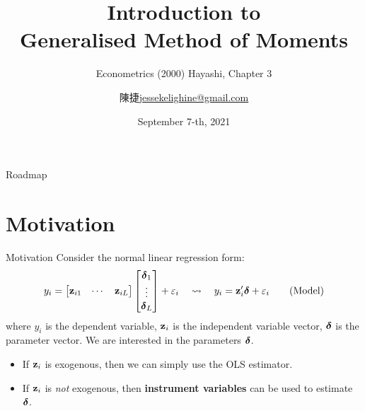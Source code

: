 \documentclass{beamer}
\title{\textbf{Introduction to \\Generalised Method of Moments}}
\subtitle{Econometrics (2000) Hayashi, Chapter 3}
\author{陳\;捷\hspace{1em}\url{jessekelighine@gmail.com}}
\date{September 7-th, 2021}
\begin{document}
\begin{frame}
	\maketitle
\end{frame}

\begin{frame}{Roadmap}
	\tableofcontents
\end{frame}

\section{Motivation}

\begin{frame}{Motivation}
	Consider the normal linear regression form:
	\begin{align}
		y_i =
		\begin{bmatrix}
			\mathbf{z}_{i1} & \cdots & \mathbf{z}_{iL}
		\end{bmatrix}
		\begin{bmatrix}
			\boldsymbol{\delta}_1\\\vdots\\\boldsymbol{\delta}_L
		\end{bmatrix}
		+ \varepsilon_i
		\quad\leadsto\quad
		y_i = \mathbf{z}_i'\boldsymbol{\delta} + \varepsilon_i
		\tag{Model}
	\end{align}
	where
	$y_i$ is the dependent variable,
	$\mathbf{z}_i$ is the independent variable vector,
	$\boldsymbol{\delta}$ is the parameter vector.
	We are interested in the parameters $\boldsymbol{\delta}$.
	\begin{itemize}
		\item
			If $\mathbf{z}_i$ is exogenous, then we can simply use the OLS estimator.
		\item
			If $\mathbf{z}_i$ is \emph{not} exogenous,
			then \textbf{instrument variables} can be used
			to estimate $\boldsymbol{\delta}$.
	\end{itemize}
\end{frame}
\end{document}
